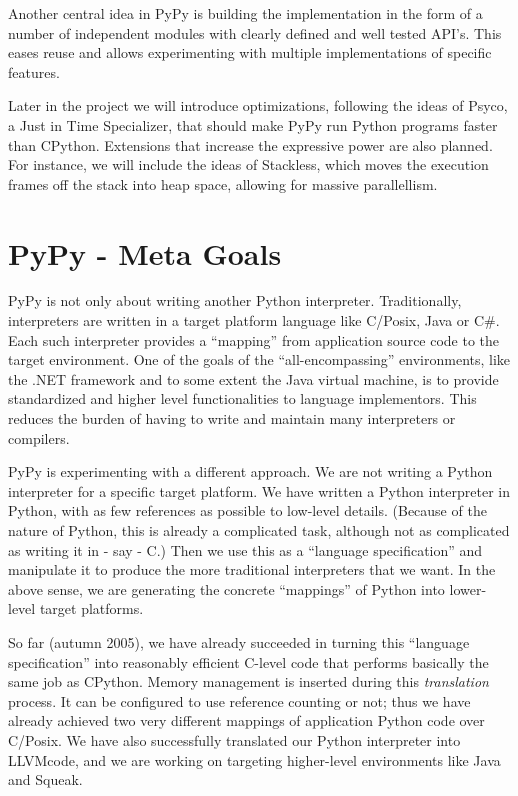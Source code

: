 \documentclass[a4paper,11pt,english]{article}
\begin{document}
Another central idea in PyPy is building the implementation in the form
of a number of independent modules with clearly defined and well tested API's. 
This eases reuse and allows experimenting with multiple implementations 
of specific features.

Later in the project we will introduce optimizations, following the
ideas of Psyco\footnotemark[4], a Just in Time Specializer, that should make PyPy
run Python programs faster than CPython. Extensions that increase the
expressive power are also planned. For instance, we will include the
ideas of Stackless\footnotemark[5], which moves the execution frames off the stack into
heap space, allowing for massive parallellism.



\hypertarget{pypy-meta-goals}{}
\section{PyPy - Meta Goals}

PyPy is not only about writing another Python interpreter.
Traditionally, interpreters are written in a target platform language
like C/Posix, Java or C{\#}.  Each such interpreter provides a ``mapping''
from application source code to the target environment.  One of the
goals of the ``all-encompassing'' environments, like the .NET framework
and to some extent the Java virtual machine, is to provide standardized
and higher level functionalities to language implementors.  This reduces
the burden of having to write and maintain many interpreters or
compilers.

PyPy is experimenting with a different approach.  We are not writing a
Python interpreter for a specific target platform.  We have written a
Python interpreter in Python, with as few references as possible to
low-level details.  (Because of the nature of Python, this is already
a complicated task, although not as complicated as writing it in - say
- C.)  Then we use this as a ``language specification'' and manipulate
it to produce the more traditional interpreters that we want.  In the
above sense, we are generating the concrete ``mappings'' of Python into
lower-level target platforms.

So far (autumn 2005), we have already succeeded in turning this ``language
specification'' into reasonably efficient C-level code that performs
basically the same job as CPython.  Memory management is inserted during
this \emph{translation} process.  It can be configured to use reference
counting or not; thus we have already achieved two very different
mappings of application Python code over C/Posix.  We have
also successfully translated our Python interpreter into LLVM\footnotemark[6] code,
and we are working on targeting higher-level environments like
Java and Squeak.
\end{document}
